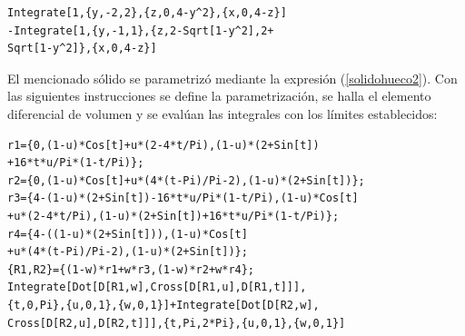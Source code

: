 \begin{parrafonumerado}
%

\begin{tcolorbox}[title=\bf Instrucción en \verb"Mathematica"]\begin{Verbatim}[formatcom=\letraverbatim]
Integrate[1,{y,-2,2},{z,0,4-y^2},{x,0,4-z}]
-Integrate[1,{y,-1,1},{z,2-Sqrt[1-y^2],2+
Sqrt[1-y^2]},{x,0,4-z}]
\end{Verbatim}
\end{tcolorbox}

El mencionado sólido se parametrizó mediante la expresión (\ref{solidohueco2}).
Con las siguientes instrucciones se define la parametrización, se halla el elemento diferencial de
volumen y se evalúan las integrales con los límites establecidos:

%

\begin{tcolorbox}[title=\bf Instrucción en \verb"Mathematica", top=2pt,bottom=2pt,boxsep=0pt,before skip=2pt,after skip=0pt]
\begin{Verbatim}[formatcom=\letraverbatim]
r1={0,(1-u)*Cos[t]+u*(2-4*t/Pi),(1-u)*(2+Sin[t])
+16*t*u/Pi*(1-t/Pi)};
r2={0,(1-u)*Cos[t]+u*(4*(t-Pi)/Pi-2),(1-u)*(2+Sin[t])};
r3={4-(1-u)*(2+Sin[t])-16*t*u/Pi*(1-t/Pi),(1-u)*Cos[t]
+u*(2-4*t/Pi),(1-u)*(2+Sin[t])+16*t*u/Pi*(1-t/Pi)};
r4={4-((1-u)*(2+Sin[t])),(1-u)*Cos[t]
+u*(4*(t-Pi)/Pi-2),(1-u)*(2+Sin[t])};
{R1,R2}={(1-w)*r1+w*r3,(1-w)*r2+w*r4};
Integrate[Dot[D[R1,w],Cross[D[R1,u],D[R1,t]]],
{t,0,Pi},{u,0,1},{w,0,1}]+Integrate[Dot[D[R2,w],
Cross[D[R2,u],D[R2,t]]],{t,Pi,2*Pi},{u,0,1},{w,0,1}]
\end{Verbatim}
\end{tcolorbox}

\end{parrafonumerado}

